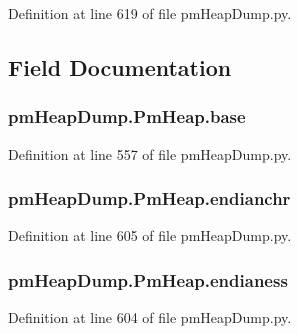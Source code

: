 Definition at line 619 of file pm\-Heap\-Dump.\-py.



\subsection{Field Documentation}
\hypertarget{classpm_heap_dump_1_1_pm_heap_a57ad2b4276dd1dd0ce0d2dd8dbd97d42}{
\subsubsection[{base}]{\setlength{\rightskip}{0pt plus 5cm}pm\-Heap\-Dump.\-Pm\-Heap.\-base}}\label{classpm_heap_dump_1_1_pm_heap_a57ad2b4276dd1dd0ce0d2dd8dbd97d42}


Definition at line 557 of file pm\-Heap\-Dump.\-py.

\hypertarget{classpm_heap_dump_1_1_pm_heap_ab0eb6ed3da3e0658d955b1f090a64110}{
\subsubsection[{endianchr}]{\setlength{\rightskip}{0pt plus 5cm}pm\-Heap\-Dump.\-Pm\-Heap.\-endianchr}}\label{classpm_heap_dump_1_1_pm_heap_ab0eb6ed3da3e0658d955b1f090a64110}


Definition at line 605 of file pm\-Heap\-Dump.\-py.

\hypertarget{classpm_heap_dump_1_1_pm_heap_a1e169147a7405dc3667f87fdac9f5141}{
\subsubsection[{endianess}]{\setlength{\rightskip}{0pt plus 5cm}pm\-Heap\-Dump.\-Pm\-Heap.\-endianess}}\label{classpm_heap_dump_1_1_pm_heap_a1e169147a7405dc3667f87fdac9f5141}


Definition at line 604 of file pm\-Heap\-Dump.\-py.

